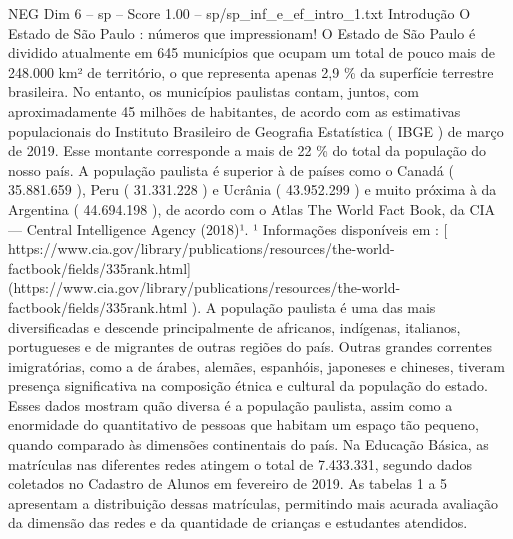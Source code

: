 \begin{textsample}{NEG Dim 6 – sp – Score 1.00 – sp/sp\_inf\_e\_ef\_intro\_1.txt}  \label{ex:f6_neg_210}
Introdução O Estado de São Paulo : números que impressionam!
O Estado de São Paulo é dividido atualmente em 645 municípios que ocupam um total de pouco mais de 248.000 km² de território, o que representa apenas 2,9 \% da superfície terrestre brasileira.
No entanto, os municípios paulistas contam, juntos, com aproximadamente 45 milhões de habitantes, de acordo com as estimativas populacionais do Instituto Brasileiro de Geografia Estatística ( IBGE ) de março de 2019.
Esse montante corresponde a mais de 22 \% do total da população do nosso país.
A população paulista é superior à de países como o Canadá ( 35.881.659 ), Peru ( 31.331.228 ) e Ucrânia ( 43.952.299 ) e muito próxima à da Argentina ( 44.694.198 ), de acordo com o Atlas The World Fact Book, da CIA — Central Intelligence Agency (2018)¹. ¹ Informações disponíveis em : [ https://www.cia.gov/library/publications/resources/the-world-factbook/fields/335rank.html](https://www.cia.gov/library/publications/resources/the-world-factbook/fields/335rank.html ).
A população paulista é uma das mais diversificadas e descende principalmente de africanos, indígenas, italianos, portugueses e de migrantes de outras regiões do país.
Outras grandes correntes imigratórias, como a de árabes, alemães, espanhóis, japoneses e chineses, tiveram presença significativa na composição étnica e cultural da população do estado.
Esses dados mostram quão diversa é a população paulista, assim como a enormidade do quantitativo de pessoas que habitam um espaço tão pequeno, quando comparado às dimensões continentais do país.
Na Educação Básica, as matrículas nas diferentes redes atingem o total de 7.433.331, segundo dados coletados no Cadastro de Alunos em fevereiro de 2019.
As tabelas 1 a 5 apresentam a distribuição dessas matrículas, permitindo mais acurada avaliação da dimensão das redes e da quantidade de crianças e estudantes atendidos.

\end{textsample}
